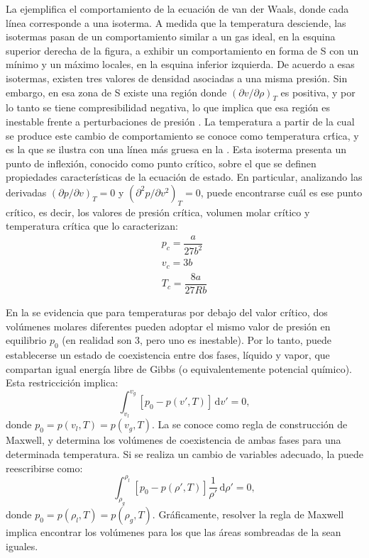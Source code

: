 La  ejemplifica el comportamiento de la ecuaci\'on de van der Waals, donde cada l\'inea corresponde a una isoterma. A medida que la temperatura desciende, las isotermas pasan de un comportamiento similar a un gas ideal, en la esquina superior derecha de la figura, a exhibir un comportamiento en forma de S con un m\'inimo y un m\'aximo locales, en la esquina inferior izquierda. De acuerdo a esas isotermas, existen tres valores de densidad asociadas a una misma presi\'on. Sin embargo, en esa zona de S existe una regi\'on donde $(\partial v / \partial \rho)_T$ es positiva, y por lo tanto se tiene compresibilidad negativa, lo que implica que esa regi\'on es inestable frente a perturbaciones de presi\'on \cite{blundell_concepts_2006}.
La temperatura a partir de la cual se produce este cambio de comportamiento se conoce como temperatura cr\'tica, y es la que se ilustra con una l\'inea m\'as gruesa en la . Esta isoterma presenta un punto de inflexi\'on, conocido como punto cr\'itico, sobre el que se definen propiedades caracter\'isticas de la ecuaci\'on de estado. En particular, analizando las derivadas $(\partial p / \partial v)_T = 0$ y $(\partial^2 p / \partial v^2)_T = 0$, puede encontrarse cu\'al es ese punto cr\'itico, es decir, los valores de presi\'on cr\'itica, volumen molar cr\'itico y temperatura cr\'itica que lo caracterizan:
\begin{equation}
	\begin{gathered}
		p_c = \dfrac{a}{27 b^2} \\
		v_c = 3b \\
		T_c = \dfrac{8 a}{27 R b}
	\end{gathered}
	\label{eq:vdw_param_crit}
\end{equation}

En la  se evidencia que para temperaturas por debajo del valor cr\'itico, dos vol\'umenes molares diferentes pueden adoptar el mismo valor de presi\'on en equilibrio $p_0$ (en realidad son 3, pero uno es inestable). Por lo tanto, puede establecerse un estado de coexistencia entre dos fases, l\'iquido y vapor, que compartan igual energ\'ia libre de Gibbs (o equivalentemente potencial qu\'imico). Esta restriccici\'on implica:
\begin{equation}
	\int_{v_l}^{v_g} \left[p_0 - p(v',T)\right] \, \mbox{d} v' = 0,
	\label{eq:maxwell_constr}
\end{equation}
donde $p_0 = p(v_l,T) = p(v_g,T)$. La  se conoce como regla de construcci\'on de Maxwell, y determina los vol\'umenes de coexistencia de ambas fases para una determinada temperatura. Si se realiza un cambio de variables adecuado, la  puede reescribirse como:
\begin{equation}
	\int_{\rho_g}^{\rho_l} \left[p_0 - p(\rho',T)\right] \dfrac{1}{\rho'} \, \mbox{d} \rho' = 0,
	\label{eq:maxwell_constr_rho}
\end{equation}
donde $p_0 = p(\rho_l,T) = p(\rho_g,T)$. Gr\'aficamente, resolver la regla de Maxwell implica encontrar los vol\'umenes para los que las \'areas sombreadas de la  sean iguales. 

